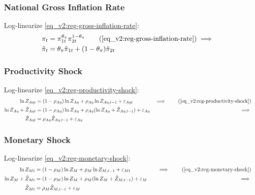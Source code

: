 \documentclass[../thesis.tex]{subfiles}
\begin{document}

\subsubsection*{National Gross Inflation Rate}

Log-linearize \ref{eq_v2:reg-gross-inflation-rate}:
\begin{align}
	\pi_{t} &= \pi_{1t}^{\theta_{\pi}} \pi_{2t}^{1 - \theta_{\pi}} \tag{\ref{eq_v2:reg-gross-inflation-rate}} \implies \nonumber \\
	\hat{\pi}_{t} &= \theta_{\pi} \hat{\pi}_{1t} + (1 - \theta_{\pi}) \hat{\pi}_{2t} \label{eq_v2:reg-gross-inflation-rate-ll}
\end{align}


\subsubsection*{Productivity Shock}

Log-linearize \ref{eq_v2:reg-productivity-shock}:
\begin{alignat}{2}
	\ln{Z_{A\eta t}} &= (1-\rho_{A\eta})\ln{Z_{A\eta}} + \rho_{A\eta}\ln{Z_{A\eta,t-1}} + \varepsilon_{A\eta t} &\implies \tag{\ref{eq_v2:reg-productivity-shock}} \\
	\ln{Z_{A\eta}} + \hat{Z}_{A\eta t} &= (1-\rho_{A\eta}) \ln{Z_{A\eta}} + \rho_{A\eta} (\ln{Z_{A\eta}} + \hat{Z}_{A\eta, t-1}) + \varepsilon_{A\eta} &\implies \nonumber \\
	\hat{Z}_{A\eta t} &= \rho_{A\eta} \hat{Z}_{A\eta, t-1} + \varepsilon_{A\eta} \label{eq_v2:reg-ll-productivity-shock}
\end{alignat}


\subsubsection*{Monetary Shock}

Log-linearize \ref{eq_v2:reg-monetary-shock}:
\begin{alignat}{2}
	\ln{Z_{Mt}} &= (1-\rho_M)\ln{Z_M} + \rho_M\ln{Z_{M,t-1}} + \varepsilon_{Mt} &\implies \tag{\ref{eq_v2:reg-monetary-shock}} \\
	\ln{Z_{M}} + \hat{Z}_{Mt} &= (1-\rho_M) \ln{Z_M} + \rho_M (\ln{Z_{M}} + \hat{Z}_{M,t-1}) + \varepsilon_{M} \quad &\implies \nonumber \\
	\hat{Z}_{Mt} &= \rho_M \hat{Z}_{M,t-1} + \varepsilon_{M} \label{eq_v2:reg-ll-monetary-shock}
\end{alignat}
\end{document}
